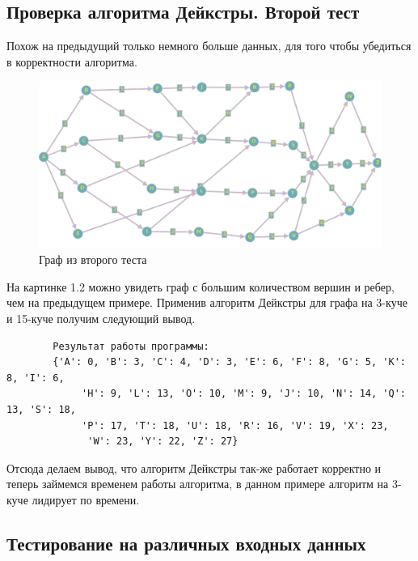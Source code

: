 \documentclass[a4paper, 12pt]{article}
\theoremstyle{definition}
\begin{document}
	\subsection{Проверка алгоритма Дейкстры. Второй тест}
	Похож на предыдущий только немного больше данных, для того
	чтобы убедиться в корректности алгоритма.\newline
	\begin{figure}[h]
		\centering
		\includegraphics[scale=0.2]{img/2graph.png}
		\caption{Граф из второго теста}
		\label{fig:my_image}
	\end{figure}
	На картинке 1.2 можно увидеть граф с большим количеством вершин и
	ребер, чем на предыдущем примере. Применив алгоритм Дейкстры для
	графа на 3-куче и 15-куче получим следующий вывод.
	\begin{verbatim}
		Результат работы программы:
		{'A': 0, 'B': 3, 'C': 4, 'D': 3, 'E': 6, 'F': 8, 'G': 5, 'K': 8, 'I': 6,
			 'H': 9, 'L': 13, 'O': 10, 'M': 9, 'J': 10, 'N': 14, 'Q': 13, 'S': 18, 
			 'P': 17, 'T': 18, 'U': 18, 'R': 16, 'V': 19, 'X': 23,
			  'W': 23, 'Y': 22, 'Z': 27}
	\end{verbatim}
	Отсюда делаем вывод, что алгоритм Дейкстры так-же работает корректно и теперь займемся временем работы алгоритма, в данном примере алгоритм на 3-куче лидирует по времени.\newline
	\subsection{Тестирование на различных входных данных}
\end{document}
